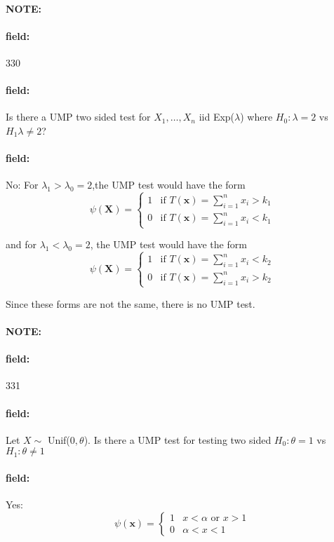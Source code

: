 \documentclass[12pt]{article}
\newenvironment{note}{\paragraph{NOTE:}}{}
\newenvironment{field}{\paragraph{field:}}{}
\begin{document}
\begin{note}
    \begin{field}
        \tiny 330
    \end{field}
    \begin{field}
        Is there a UMP two sided test for $X_1, \ldots , X_n$ iid Exp($\lambda$) where $H_0: \lambda = 2 $ vs $H_1 \lambda \neq 2$?
    \end{field}
    \begin{field}
        No:
        For $\lambda_1 > \lambda_0 = 2$,the UMP test would have the form
        \[
          \psi(\mathbf{X}) =
          \begin{cases}
              1 &  \text{if } T(\mathbf{x}) = \sum_{i=1}^n x_i > k_1\\
              0  & \text{if } T(\mathbf{x}) = \sum_{i=1}^n x_i <k_1
          \end{cases}
        \]

        and for $\lambda_1 < \lambda_0 = 2$, the UMP test would have the form
        \[
          \psi(\mathbf{X}) =
          \begin{cases}
              1 &  \text{if } T(\mathbf{x}) = \sum_{i=1}^n x_i < k_2\\
              0  & \text{if } T(\mathbf{x}) = \sum_{i=1}^n x_i > k_2
          \end{cases}
        \]


        Since these forms are not the same, there is no UMP test.
    \end{field}
\end{note}


\begin{note}
    \begin{field}
        \tiny 331
    \end{field}
    \begin{field}
        Let $X\sim$ Unif($0,\theta$). Is there a UMP test for testing two sided $H_0: \theta = 1$ vs $H_1: \theta \neq 1$
    \end{field}
    \begin{field}
        Yes:  \[
          \psi(\mathbf{x}) =
          \begin{cases}
               1 & x < \alpha \text{ or } x > 1 \\
               0 & \alpha < x < 1
          \end{cases}
        \]

    \end{field}
\end{note}
\end{document}
